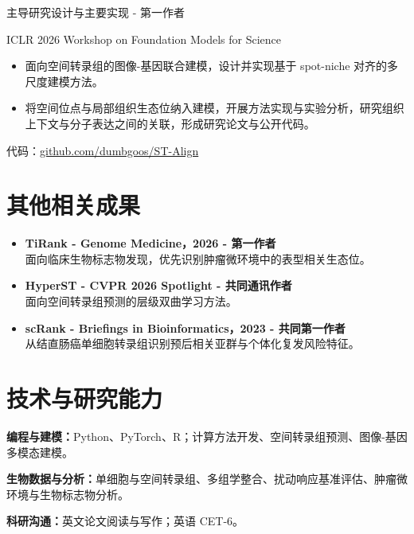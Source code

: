 \documentclass{resume}
\newcommand{\detail}[1]{{\small\color{muted}#1}\par}
\begin{document}
\detail{主导研究设计与主要实现 - 第一作者}
\detail{ICLR 2026 Workshop on Foundation Models for Science}
\begin{itemize}
\item 面向空间转录组的图像-基因联合建模，设计并实现基于 spot-niche 对齐的多尺度建模方法。
\item 将空间位点与局部组织生态位纳入建模，开展方法实现与实验分析，研究组织上下文与分子表达之间的关联，形成研究论文与公开代码。
\end{itemize}
\detail{代码：\href{https://github.com/dumbgoos/ST-Align}{github.com/dumbgoos/ST-Align}}

\section*{其他相关成果}
\begin{itemize}
\item \textbf{TiRank - Genome Medicine，2026 - 第一作者}\\
面向临床生物标志物发现，优先识别肿瘤微环境中的表型相关生态位。
\item \textbf{HyperST - CVPR 2026 Spotlight - 共同通讯作者}\\
面向空间转录组预测的层级双曲学习方法。
\item \textbf{scRank - Briefings in Bioinformatics，2023 - 共同第一作者}\\
从结直肠癌单细胞转录组识别预后相关亚群与个体化复发风险特征。
\end{itemize}

\section*{技术与研究能力}
\textbf{编程与建模：}Python、PyTorch、R；计算方法开发、空间转录组预测、图像-基因多模态建模。\par
\textbf{生物数据与分析：}单细胞与空间转录组、多组学整合、扰动响应基准评估、肿瘤微环境与生物标志物分析。\par
\textbf{科研沟通：}英文论文阅读与写作；英语 CET-6。
\end{document}
